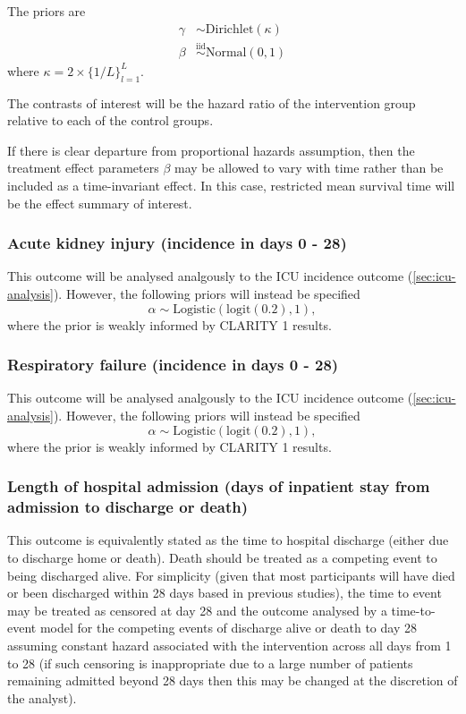 \documentclass[11pt,parskip=half-]{scrartcl}
\begin{document}
The priors are
$$
\begin{aligned}
    \gamma & \sim \text{Dirichlet}(\kappa) \\
    \beta  & \overset{\text{iid}}{\sim} \text{Normal}(0, 1)
\end{aligned}
$$
where $\kappa = 2\times\{1/L\}_{l=1}^L$.

The contrasts of interest will be the hazard ratio of the intervention group relative to each of the control groups.

If there is clear departure from proportional hazards assumption, then the treatment effect parameters $\beta$ may be allowed to vary with time rather than be included as a time-invariant effect. In this case, restricted mean survival time will be the effect summary of interest.

\subsubsection{Acute kidney injury (incidence in days 0 - 28)}
This outcome will be analysed analgously to the ICU incidence outcome (\ref{sec:icu-analysis}). However, the following priors will instead be specified
$$
    \alpha \sim \text{Logistic}(\text{logit}(0.2), 1),
$$
where the prior is weakly informed by CLARITY 1 results.

\subsubsection{Respiratory failure (incidence in days 0 - 28)}
This outcome will be analysed analgously to the ICU incidence outcome (\ref{sec:icu-analysis}). However, the following priors will instead be specified
$$
    \alpha \sim \text{Logistic}(\text{logit}(0.2), 1),
$$
where the prior is weakly informed by CLARITY 1 results.

\subsubsection{Length of hospital admission (days of inpatient stay from admission to discharge or death)}

This outcome is equivalently stated as the time to hospital discharge (either due to discharge home or death). Death should be treated as a competing event to being discharged alive. For simplicity (given that most participants will have died or been discharged within 28 days based in previous studies), the time to event may be treated as censored at day 28 and the outcome analysed by a time-to-event model for the competing events of discharge alive or death to day 28 assuming constant hazard associated with the intervention across all days from 1 to 28 (if such censoring is inappropriate due to a large number of patients remaining admitted beyond 28 days then this may be changed at the discretion of the analyst).
\end{document}
